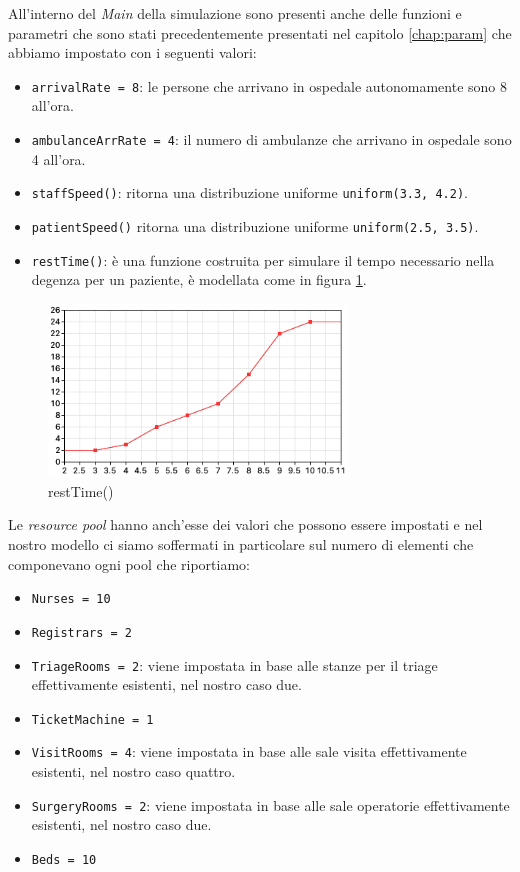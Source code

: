All'interno del \textit{Main} della simulazione sono presenti anche delle funzioni e parametri che sono stati precedentemente presentati nel capitolo \ref{chap:param} che abbiamo impostato con i seguenti valori:

\begin{itemize}
    \item \texttt{arrivalRate = 8}: le persone che arrivano in ospedale autonomamente sono 8 all'ora.
    \item \texttt{ambulanceArrRate = 4}: il numero di ambulanze che arrivano in ospedale sono 4 all'ora.
    \item \texttt{staffSpeed()}: ritorna una distribuzione uniforme \texttt{uniform(3.3, 4.2)}.
    \item \texttt{patientSpeed()} ritorna una distribuzione uniforme \texttt{uniform(2.5, 3.5)}.
    \item \texttt{restTime()}: è una funzione costruita per simulare il tempo necessario nella degenza per un paziente, è modellata come in figura \ref{fig:function}.
\end{itemize}
\clearpage

\begin{figure}[!h]
    \centering
    \includegraphics[width=300px ]{Immagini/function.png} 
    \caption{restTime()}
    \label{fig:function}
\end{figure}


Le \textit{resource pool} hanno anch'esse dei valori che possono essere impostati e nel nostro modello ci siamo soffermati in particolare sul numero di elementi che componevano ogni pool che riportiamo:
\begin{itemize}
\item \texttt{Nurses = 10}
\item \texttt{Registrars = 2}
\item \texttt{TriageRooms = 2}: viene impostata in base alle stanze per il triage effettivamente esistenti, nel nostro caso due.
\item \texttt{TicketMachine = 1}
\item \texttt{VisitRooms = 4}: viene impostata in base alle sale visita effettivamente esistenti, nel nostro caso quattro.
\item \texttt{SurgeryRooms = 2}: viene impostata in base alle sale operatorie effettivamente esistenti, nel nostro caso due.
\item \texttt{Beds = 10}
\end{itemize}

